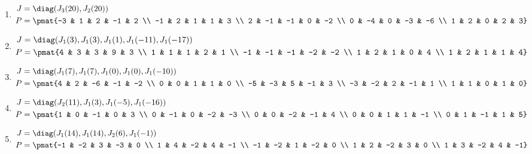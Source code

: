 \begin{enumerate}
\item

\begin{align*}
J &= \diag(J_{3}(20), J_{2}(20))\\
P &= \pmat{-3 & 1 & 2 & -1 & 2 \\ -1 & 2 & 1 & 1 & 3 \\ 2 & -1 & -1 & 0 & -2 \\ 0 & -4 & 0 & -3 & -6 \\ 1 & 2 & 0 & 2 & 3}
\end{align*}

\item

\begin{align*}
J &= \diag(J_{1}(3), J_{1}(3), J_{1}(1), J_{1}(-11), J_{1}(-17))\\
P &= \pmat{4 & 3 & 3 & 9 & 3 \\ 1 & 1 & 1 & 2 & 1 \\ -1 & -1 & -1 & -2 & -2 \\ 1 & 2 & 1 & 0 & 4 \\ 1 & 2 & 1 & 1 & 4}
\end{align*}

\item

\begin{align*}
J &= \diag(J_{1}(7), J_{1}(7), J_{1}(0), J_{1}(0), J_{1}(-10))\\
P &= \pmat{4 & 2 & -6 & -1 & -2 \\ 0 & 0 & 1 & 1 & 0 \\ -5 & -3 & 5 & -1 & 3 \\ -3 & -2 & 2 & -1 & 1 \\ 1 & 1 & 0 & 1 & 0}
\end{align*}

\item

\begin{align*}
J &= \diag(J_{2}(11), J_{1}(3), J_{1}(-5), J_{1}(-16))\\
P &= \pmat{1 & 0 & -1 & 0 & 3 \\ 0 & -1 & 0 & -2 & -3 \\ 0 & 0 & -2 & -1 & 4 \\ 0 & 0 & 1 & 1 & -1 \\ 0 & 1 & -1 & 1 & 5}
\end{align*}

\item

\begin{align*}
J &= \diag(J_{1}(14), J_{1}(14), J_{2}(6), J_{1}(-1))\\
P &= \pmat{-1 & -2 & 3 & -3 & 0 \\ 1 & 4 & -2 & 4 & -1 \\ -1 & -2 & 1 & -2 & 0 \\ 1 & 2 & -2 & 3 & 0 \\ 1 & 3 & -2 & 4 & -1}
\end{align*}


\end{enumerate}
